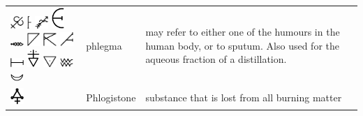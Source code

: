 \documentclass[british,final,landscape]{scrartcl}
\begin{document}
\begin{refsection}
\begin{supertabular}{p{0.3\textwidth}p{0.34\textwidth}p{0.34\textwidth}}
  \includegraphics[width=5mm]{Concepts/Phlegma}   \includegraphics[height=5mm]{Concepts/Phlegma2} \includegraphics[width=5mm]{Concepts/Phlegma3} \includegraphics[width=5mm]{Concepts/Phlegma4}  \includegraphics[width=5mm]{Concepts/Phlegma5}  \includegraphics[width=5mm]{Concepts/Phlegma6} \includegraphics[width=5mm]{Concepts/Phlegma7}  \includegraphics[width=5mm]{Concepts/Phlegma8}  \includegraphics[width=5mm]{Concepts/Phlegma9} \includegraphics[width=5mm]{Concepts/Phlegma10} \includegraphics[width=5mm]{Concepts/Phlegma11} \includegraphics[width=5mm]{Concepts/Phlegma12} \includegraphics[width=5mm]{Concepts/Phlegma13} & phlegma & may refer to either one of the humours in the human body, or to sputum. Also used for the aqueous fraction of a distillation. \\
  \includegraphics[width=5mm]{Concepts/Phlogistone} & Phlogistone & substance that is lost from all burning matter\\

\end{supertabular}
\end{refsection}
\end{document}
